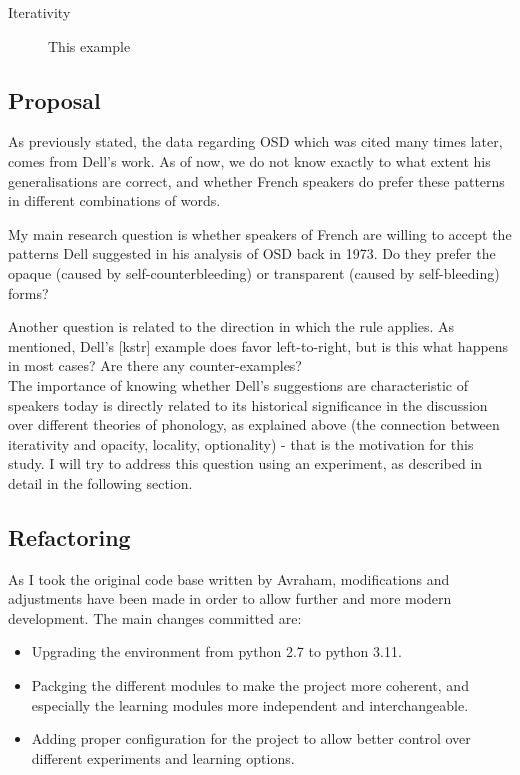 \documentclass{article}
\begin{document}
\begin{description}
   \item[Iterativity] This example
\end{description}

\subsection{Proposal} %
As previously stated, the data regarding OSD which was cited many times later, comes from Dell's work. As of now, we do not know exactly to what extent his generalisations are correct, and whether French speakers do prefer these patterns in different combinations of words.

My main research question is whether speakers of French are willing to accept the patterns Dell suggested in his analysis of OSD back in 1973.  Do they prefer the opaque (caused by self-counterbleeding) or transparent (caused by self-bleeding) forms?

Another question is related to the direction in which the rule applies. As mentioned,  Dell's [kstr] example does favor left-to-right, but is this what happens in most cases? Are there any counter-examples?\\

The importance of knowing whether Dell's suggestions are characteristic of speakers today is directly related to its historical significance in the discussion over different theories of phonology,  as explained above (the connection between iterativity and opacity, locality, optionality) - that is the motivation for this study. I will try to address this question using an experiment, as described in detail in the following section.

\clearpage
\subsection{Refactoring}
As I took the original code base written by Avraham, modifications and adjustments have been made in order to allow further and more modern development. The main changes committed are:
\begin{itemize}
  \item Upgrading the environment from python 2.7 to python 3.11.
  \item Packging the different modules to make the project more coherent, and especially the learning modules more independent and interchangeable.
  \item Adding proper configuration for the project to allow better control over different experiments and learning options.
\end{itemize}
\end{document}
